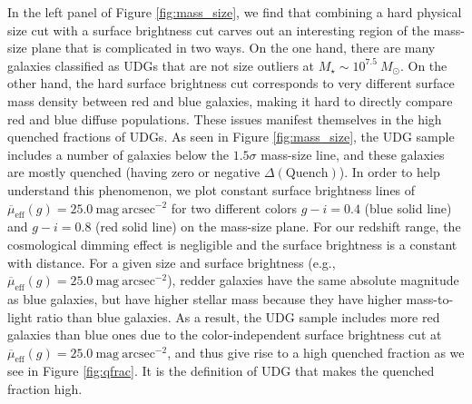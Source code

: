 \documentclass[twocolumn,astrosymb,twocolappendix]{aastex631}
\newcommand{\sbunit}{\mathrm{mag\ arcsec}^{-2}}
\newcommand{\sbeff}{\overline{\mu}_{\mathrm{eff}}(g)}
\begin{document}
\begin{CJK*}{UTF8}{gbsn}
In the left panel of Figure \ref{fig:mass_size}, we find that combining a hard physical size cut with a surface brightness cut carves out an interesting region of the mass-size plane that is complicated in two ways. On the one hand, there are many galaxies classified as UDGs that are not size outliers at $M_\star \sim 10^{7.5}\ M_\odot$. On the other hand, the hard surface brightness cut corresponds to very different surface mass density between red and blue galaxies, making it hard to directly compare red and blue diffuse populations. These issues manifest themselves in the high quenched fractions of UDGs. As seen in Figure \ref{fig:mass_size}, the UDG sample includes a number of galaxies below the $1.5\sigma$ mass-size line, and these galaxies are mostly quenched (having zero or negative $\Delta(\mathrm{Quench})$). In order to help understand this phenomenon, we plot constant surface brightness lines of $\sbeff=25.0\ \sbunit$ for two different colors $g-i=0.4$ (blue solid line) and $g-i=0.8$ (red solid line) on the mass-size plane. For our redshift range, the cosmological dimming effect is negligible and the surface brightness is a constant with distance. For a given size and surface brightness (e.g., $\sbeff=25.0\ \sbunit$), redder galaxies have the same absolute magnitude as blue galaxies, but have higher stellar mass because they have higher mass-to-light ratio than blue galaxies. As a result, the UDG sample includes more red galaxies than blue ones due to the color-independent surface brightness cut at $\sbeff=25.0\ \sbunit$, and thus give rise to a high quenched fraction as we see in Figure \ref{fig:qfrac}. It is the definition of UDG that makes the quenched fraction high. 



\end{CJK*}
\end{document}
